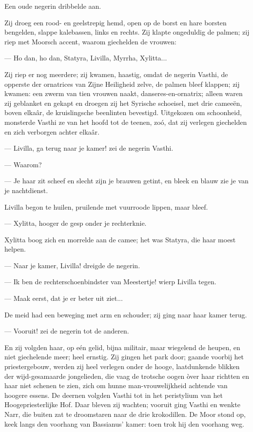 \documentclass[a4paper, 12pt, oneside, dutch]{article}
\begin{document}
Een oude negerin dribbelde aan.

Zij droeg een rood- en geelstrepig hemd, open op de borst en hare borsten bengelden, slappe kalebassen, links en rechts. Zij klapte ongeduldig de palmen; zij riep met Moorsch accent, waarom giechelden de vrouwen:

--- Ho dan, ho dan, Statyra, Livilla, Myrrha, Xylitta...

Zij riep er nog meerdere; zij kwamen, haastig, omdat de negerin Vasthi, de opperste der ornatrices van Zijne Heiligheid zelve, de palmen bleef klappen; zij kwamen: een zwerm van tien vrouwen naakt, danseres-en-ornatrix; alleen waren zij geblanket en gekapt en droegen zij het Syrische schoeisel, met drie cameeën, boven elkaâr, de kruislingsche beenlinten bevestigd. Uitgekozen om schoonheid, monsterde Vasthi ze van het hoofd tot de teenen, zoó, dat zij verlegen giechelden en zich verborgen achter elkaâr.

--- Livilla, ga terug naar je kamer! zei de negerin Vasthi.

--- Waarom?

--- Je haar zit scheef en slecht zijn je brauwen getint, en bleek en blauw zie je van je nachtdienst.

Livilla begon te huilen, pruilende met vuurroode lippen, maar bleef.

--- Xylitta, hooger de gesp onder je rechterknie.

Xylitta boog zich en morrelde aan de camee; het was Statyra, die haar moest helpen.

--- Naar je kamer, Livilla! dreigde de negerin.

--- Ik ben de rechterschoenbindster van Meestertje! wierp Livilla tegen.

--- Maak eerst, dat je er beter uit ziet...

De meid had een beweging met arm en schouder; zij ging naar haar kamer terug.

--- Vooruit! zei de negerin tot de anderen.

En zij volgden haar, op eén gelid, bijna militair, maar wiegelend de heupen, en niet giechelende meer; heel ernstig. Zij gingen het park door; gaande voorbij het priestergebouw, werden zij heel verlegen onder de hooge, laatdunkende blikken der wijd-gesamaarde jongelieden, die vaag de trotsche oogen òver haar richtten en haar niet schenen te zien, zich om hunne man-vrouwelijkheid achtende van hoogere essens. De deernen volgden Vasthi tot in het peristylium van het Hoogepriesterlijke Hof. Daar bleven zij wachten; vooruit ging Vasthi en wenkte Narr, die buiten zat te droomstaren naar de drie krokodillen. De Moor stond op, keek langs den voorhang van Bassianus' kamer: toen trok hij den voorhang weg.
\end{document}
